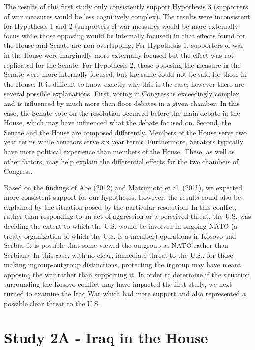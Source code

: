 \documentclass[english,,man,floatsintext]{apa6}
\begin{document}
The results of this first study only consistently support Hypothesis 3 (supporters of war measures would be less cognitively complex). The results were inconsistent for Hypothesis 1 and 2 (supporters of war measures would be more externally focus while those opposing would be internally focused) in that effects found for the House and Senate are non-overlapping. For Hypothesis 1, supporters of war in the House were marginally more externally focused but the effect was not replicated for the Senate. For Hypothesis 2, those opposing the measure in the Senate were more internally focused, but the same could not be said for those in the House.
It is difficult to know exactly why this is the case; however there are several possible explanations. First, voting in Congress is exceedingly complex and is influenced by much more than floor debates in a given chamber. In this case, the Senate vote on the resolution occurred before the main debate in the House, which may have influenced what the debate focused on. Second, the Senate and the House are composed differently. Members of the House serve two year terms while Senators serve six year terms. Furthermore, Senators typically have more political experience than members of the House. These, as well as other factors, may help explain the differential effects for the two chambers of Congress.

Based on the findings of Abe (2012) and Matsumoto et al. (2015), we expected more consistent support for our hypotheses. However, the results could also be explained by the situation posed by the particular resolution. In this conflict, rather than responding to an act of aggression or a perceived threat, the U.S. was deciding the extent to which the U.S. would be involved in ongoing NATO (a treaty organization of which the U.S. is a member) operations in Kosovo and Serbia. It is possible that some viewed the outgroup as NATO rather than Serbians. In this case, with no clear, immediate threat to the U.S., for those making ingroup-outgroup distinctions, protecting the ingroup may have meant opposing the war rather than supporting it. In order to determine if the situation surrounding the Kosovo conflict may have impacted the first study, we next turned to examine the Iraq War which had more support and also represented a possible clear threat to the U.S.

\hypertarget{study-2a---iraq-in-the-house}{%
\section{Study 2A - Iraq in the House}\label{study-2a---iraq-in-the-house}}
\end{document}
